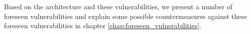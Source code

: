 Based on the architecture and these vulnerabilities, we present a number of foreseen vulnerabilities and explain some possible countermeasures against these foreseen vulnerabilities in chapter \ref{chap:foreseen_vulnerabilities}.


